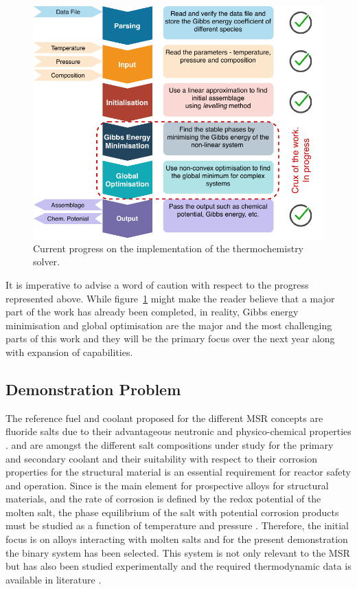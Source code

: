     \begin{figure}[h]
        \centering
        \includegraphics[scale=0.9]{figures/YJ_Progress.pdf}
        \caption{Current progress on the implementation of the thermochemistry solver.}
        \label{fig:progress}
    \end{figure}
	
	It is imperative to advise a word of caution with respect to the progress represented above. While figure~\ref{fig:progress} might make the reader believe that a major part of the work has already been completed, in reality, Gibbs energy minimisation and global optimisation are the major and the most challenging parts of this work and they will be the primary focus over the next year along with expansion of capabilities.
	
	\subsection{Demonstration Problem}
	The reference fuel and coolant proposed for the different MSR concepts are fluoride salts due to their advantageous neutronic and physico-chemical properties \cite{BENES2012359}.  and  are amongst the different salt compositions under study for the primary and secondary coolant and their suitability with respect to their corrosion properties for the structural material is an essential requirement for reactor safety and operation. Since  is the main element for prospective alloys for structural materials, and the rate of corrosion is defined by the redox potential of the molten salt, the phase equilibrium of the salt with potential corrosion products must be studied as a function of temperature and pressure \cite{OcadizFlores18}. Therefore, the initial focus is on  alloys interacting with molten  salts and for the present demonstration the  binary system has been selected. This system is not only relevant to the MSR but has also been studied experimentally and the required thermodynamic data is available in literature \cite{OcadizFlores18}.

